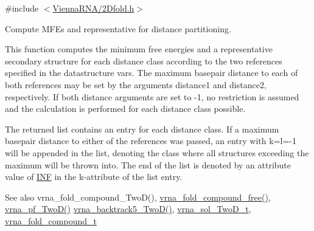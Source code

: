 {\ttfamily \#include $<$\hyperlink{2Dfold_8h}{Vienna\+R\+N\+A/2\+Dfold.\+h}$>$}



Compute M\+FE\textquotesingle{}s and representative for distance partitioning. 

This function computes the minimum free energies and a representative secondary structure for each distance class according to the two references specified in the datastructure \textquotesingle{}vars\textquotesingle{}. The maximum basepair distance to each of both references may be set by the arguments \textquotesingle{}distance1\textquotesingle{} and \textquotesingle{}distance2\textquotesingle{}, respectively. If both distance arguments are set to \textquotesingle{}-\/1\textquotesingle{}, no restriction is assumed and the calculation is performed for each distance class possible.

The returned list contains an entry for each distance class. If a maximum basepair distance to either of the references was passed, an entry with k=l=-\/1 will be appended in the list, denoting the class where all structures exceeding the maximum will be thrown into. The end of the list is denoted by an attribute value of \hyperlink{constants_8h_a12c2040f25d8e3a7b9e1c2024c618cb6}{I\+NF} in the k-\/attribute of the list entry.

\begin{DoxySeeAlso}{See also}
vrna\+\_\+fold\+\_\+compound\+\_\+\+Two\+D(), \hyperlink{group__fold__compound_ga576a077b418a9c3650e06f8e5d296fc2}{vrna\+\_\+fold\+\_\+compound\+\_\+free()}, \hyperlink{group__kl__neighborhood__pf_ga0bc3427689bd09da09b8b3094a27f836}{vrna\+\_\+pf\+\_\+\+Two\+D()} \hyperlink{group__kl__neighborhood__mfe_ga15a96fc96f4f4c2e01a11b3e17d1ef43}{vrna\+\_\+backtrack5\+\_\+\+Two\+D()}, \hyperlink{group__kl__neighborhood__mfe_structvrna__sol__TwoD__t}{vrna\+\_\+sol\+\_\+\+Two\+D\+\_\+t}, \hyperlink{group__fold__compound_ga1b0cef17fd40466cef5968eaeeff6166}{vrna\+\_\+fold\+\_\+compound\+\_\+t}
\end{DoxySeeAlso}

